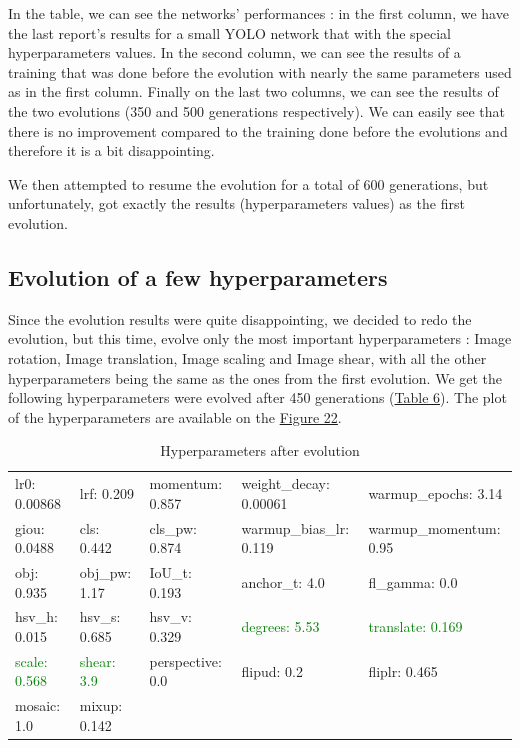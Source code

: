\documentclass{article}
\begin{document}
\bigskip

In the table, we can see the networks' performances : in the first column, we have the last report's results for a small YOLO network that with the special hyperparameters values. In the second column, we can see the results of a training that was done before the evolution with nearly the same parameters used as in the first column. Finally on the last two columns, we can see the results of the two evolutions (350 and 500 generations respectively). We can easily see that there is no improvement compared to the training done before the evolutions and therefore it is a bit disappointing.

\bigskip

We then attempted to resume the evolution for a total of 600 generations, but unfortunately, got exactly the results (hyperparameters values) as the first evolution. 

\subsection{Evolution of a few hyperparameters}

Since the evolution results were quite disappointing, we decided to redo the evolution, but this time, evolve only the most important hyperparameters : Image rotation, Image translation, Image scaling and Image shear, with all the other hyperparameters being the same as the ones from the first evolution. We get the following hyperparameters were evolved after 450 generations (\hyperref[Table 6]{Table 6}). The plot of the hyperparameters are available on the \hyperref[Figure 22]{Figure 22}.

\begin{table}[h!]
\begin{center}
    \begin{tabular}{| l | l | l | l | l |}
    \hline
    lr0: 0.00868 & lrf: 0.209 & momentum: 0.857 & weight\_decay: 0.00061 & warmup\_epochs: 3.14 \\
    giou: 0.0488 & cls: 0.442 & cls\_pw: 0.874 & warmup\_bias\_lr: 0.119  & warmup\_momentum: 0.95 \\
    obj: 0.935 & obj\_pw: 1.17 & IoU\_t: 0.193 & anchor\_t: 4.0 & fl\_gamma: 0.0 \\
    hsv\_h: 0.015 & hsv\_s: 0.685 & hsv\_v: 0.329 & \textcolor{green}{degrees: 5.53} & \textcolor{green}{translate: 0.169} \\
    \textcolor{green}{scale: 0.568} & \textcolor{green}{shear: 3.9} & perspective: 0.0 & flipud: 0.2 & fliplr: 0.465 \\
    mosaic: 1.0 & mixup: 0.142 & & & \\
    \hline
    \end{tabular}
    \caption{Hyperparameters after evolution}    
    \label{Table 6}
\end{center}
\end{table}
\end{document}
